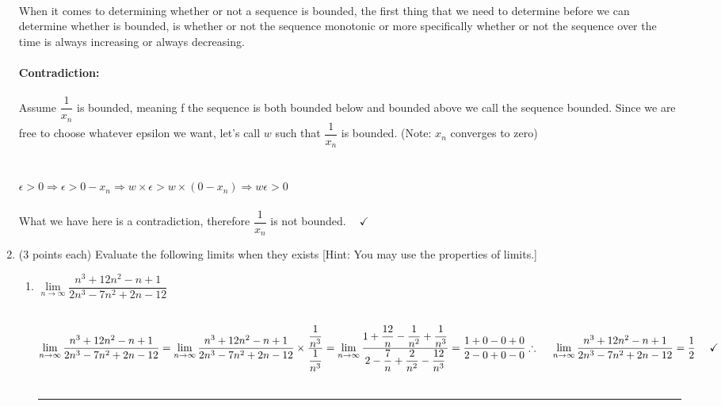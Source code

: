 \documentclass[fleqn]{article}
\begin{document}
\begin{enumerate}
      \textcolor{hwColor}{
        \\
        When it comes to determining whether or not a sequence is bounded, the first thing that we need to determine before 
        we can determine whether is bounded, is whether or not the sequence monotonic or more specifically whether or not the sequence
        over the time is always increasing or always decreasing.
        \\
        \\
        \textbf{Contradiction:}
        \\
        \\
        Assume $\dfrac{1}{x_n}$ is bounded, meaning f the sequence is both bounded below and 
        bounded above we call the sequence bounded. Since we are free to choose whatever epsilon we want,
        let's call $w$ such that $\dfrac{1}{x_n}$ is bounded. (Note: $x_n$ converges to zero)
        \\
        \\
        \\
        $
          \epsilon>0  \Longrightarrow \epsilon>0-x_n \Longrightarrow w \times \epsilon> w \times \left(0-x_n\right)
          \Longrightarrow w \epsilon>0
        $
        \\
        \\
        What we have here is a contradiction, therefore $\dfrac{1}{x_n}$ is not bounded. $ ~~~~ \checkmark$
        \\ 
      }

    \pagebreak

    \item (3 points each) Evaluate the following limits when they exists [Hint: You may use the
    properties of limits.]
    \begin{enumerate}
      \item $\lim\limits_{n\to\infty} \dfrac{n^3+12n^2-n+1}{2n^3-7n^2+2n-12}$

        \textcolor{hwColor}{
          \\
          $
            \lim\limits_{n\to\infty} \dfrac{n^3+12n^2-n+1}{2n^3-7n^2+2n-12}
            =\lim\limits_{n\to\infty} \dfrac{n^3+12n^2-n+1}{2n^3-7n^2+2n-12} \times \dfrac{\dfrac{1}{n^3}}{\dfrac{1}{n^3}}
            \\
            \\
            \\
            =\lim\limits_{n\to\infty} \dfrac{1+\dfrac{12}{n}-\dfrac{1}{n^2}+\dfrac{1}{n^3}}{2-\dfrac{7}{n}+\dfrac{2}{n^2}-\dfrac{12}{n^3}}=\dfrac{1+0-0+0}{2-0+0-0}
            \\
            \\
            \\
            \therefore ~~~~ \lim\limits_{n\to\infty} \dfrac{n^3+12n^2-n+1}{2n^3-7n^2+2n-12}=\dfrac{1}{2} ~~~~ \checkmark
          $
          \\
          \\
          \rule{15cm}{2pt}
        }


\end{enumerate}
\end{enumerate}
\end{document}
